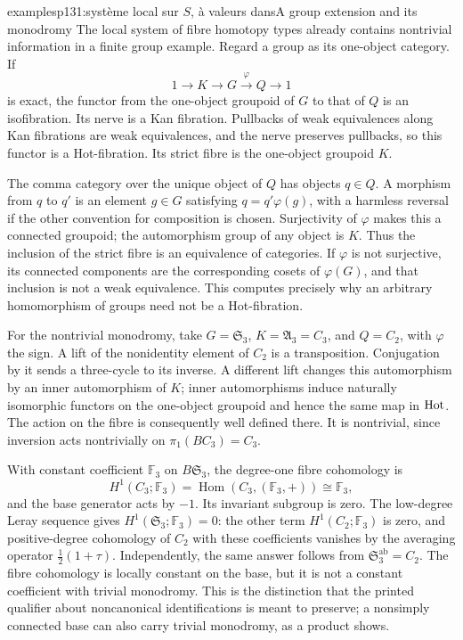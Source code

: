 \begin{dcomment}{examples}{p131:système local sur $S$, à valeurs dans}{A group extension and its monodromy}
The local system of fibre homotopy types already contains nontrivial information in a finite group example. Regard a group as its one-object category. If
\[
 1\longrightarrow K\longrightarrow G
 \xrightarrow{\varphi}Q\longrightarrow1
\]
is exact, the functor from the one-object groupoid of \(G\) to that of \(Q\) is an isofibration. Its nerve is a Kan fibration. Pullbacks of weak equivalences along Kan fibrations are weak equivalences, and the nerve preserves pullbacks, so this functor is a Hot-fibration. Its strict fibre is the one-object groupoid \(K\).

The comma category over the unique object of \(Q\) has objects \(q\in Q\). A morphism from \(q\) to \(q'\) is an element \(g\in G\) satisfying \(q=q'\varphi(g)\), with a harmless reversal if the other convention for composition is chosen. Surjectivity of \(\varphi\) makes this a connected groupoid; the automorphism group of any object is \(K\). Thus the inclusion of the strict fibre is an equivalence of categories. If \(\varphi\) is not surjective, its connected components are the corresponding cosets of \(\varphi(G)\), and that inclusion is not a weak equivalence. This computes precisely why an arbitrary homomorphism of groups need not be a Hot-fibration.

For the nontrivial monodromy, take \(G=\mathfrak S_3\), \(K=\mathfrak A_3=C_3\), and \(Q=C_2\), with \(\varphi\) the sign. A lift of the nonidentity element of \(C_2\) is a transposition. Conjugation by it sends a three-cycle to its inverse. A different lift changes this automorphism by an inner automorphism of \(K\); inner automorphisms induce naturally isomorphic functors on the one-object groupoid and hence the same map in \(\mathrm{Hot}\). The action on the fibre is consequently well defined there. It is nontrivial, since inversion acts nontrivially on \(\pi_1(BC_3)=C_3\).

With constant coefficient \(\mathbb F_3\) on \(B\mathfrak S_3\), the degree-one fibre cohomology is
\[
 H^1(C_3;\mathbb F_3)
 =\operatorname{Hom}(C_3,(\mathbb F_3,+))
 \cong\mathbb F_3,
\]
and the base generator acts by \(-1\). Its invariant subgroup is zero. The low-degree Leray sequence gives \(H^1(\mathfrak S_3;\mathbb F_3)=0\): the other term \(H^1(C_2;\mathbb F_3)\) is zero, and positive-degree cohomology of \(C_2\) with these coefficients vanishes by the averaging operator \(\frac12(1+\tau)\). Independently, the same answer follows from \(\mathfrak S_3^{\mathrm{ab}}=C_2\). The fibre cohomology is locally constant on the base, but it is not a constant coefficient with trivial monodromy. This is the distinction that the printed qualifier about noncanonical identifications is meant to preserve; a nonsimply connected base can also carry trivial monodromy, as a product shows.
\end{dcomment}


